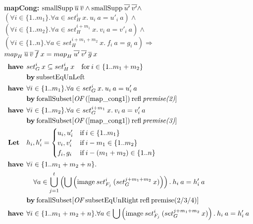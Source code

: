 \needspace{10em}
\textbf{mapCong:} $\text{smallSupp} \: \overline{u} \: \overline{v} \wedge \text{smallSupp} \: \overline{u'} \: \overline{v'} \wedge$ \\
\hspace*{1.7em} $(\forall i \in \{1..m_1\}. \forall a \in set_H^i \: x. \: u_i \: a = u'_i \: a) \wedge$ \\
\hspace*{1.7em} $(\forall i \in \{1..m_2\}. \forall a \in set_H^{i+m_1} \: x. \: v_i \: a = v'_i \: a) \wedge$ \\
\hspace*{1.7em} $(\forall i \in \{1..n\}. \forall a \in set_H^{i+m_1+m_2} \: x. \: f_i \: a = g_i \: a) \Longrightarrow$ \\
\hspace*{3em} ${map}_{H} \: \overline{u} \: \overline{v} \: \overline{f} \: x = {map}_{H} \: \overline{u'} \: \overline{v'} \: \overline{g} \: x$
\begin{align}
\have & set_G^i \: x \subseteq set_H^i \: x \quad \text{for} \: i \in \{1..m_1+m_2\} \label{map_cong1} \\
 & \by \text{subsetEqUnLeft} \nonumber \\
%
\have & \forall i \in \{1..m_1\}. \forall a \in set_G^i \: x. \: u_i \: a = u'_i \: a \label{map_cong2} \\
 & \by \OF{\text{forallSubset}}{(\ref{map_cong1}) \: \text{refl} \: \textit{premise(2)}} \nonumber \\
%
\have & \forall i \in \{1..m_2\}. \forall a \in set_G^{i+m_1} \: x. \: v_i \: a = v'_i \: a \label{map_cong3} \\
 & \by \OF{\text{forallSubset}}{(\ref{map_cong1}) \: \text{refl} \: \textit{premise(3)}} \nonumber \\
%
\textbf{Let} \quad & h_i, h'_i = \begin{cases}
u_i, u'_i & \text{if} \: i \in \{1..m_1\} \\
v_i, v'_i & \text{if} \: i - m_1 \in \{1..m_2\} \\
f_i, g_i & \text{if} \: i - (m_1+m_2) \in \{1..n\}
\end{cases} \nonumber \\
%
\have & \forall i \in \{1..m_1+m_2+n\}. \nonumber \\*
& \quad \forall a \in \bigcup_{j=1}^t \left( \bigcup \left( \text{image} \: set_{F_j}^i \: (set_G^{j+m_1+m_2} \: x) \right) \right). \: h_i \: a = h'_i \: a \label{map_cong5} \\
 & \by \OF{\text{forallSubset}}{\text{subsetEqUnRight} \: \text{refl} \: \text{premise(2/3/4)}} \nonumber \\
%
\have & \forall i \in \{1..m_1+m_2+n\}. \forall a \in \bigcup \left( \text{image} \: set_{F_j}^i \: (set_G^{j+m_1+m_2} \: x) \right). \: h_i \: a = h'_i \: a \label{map_cong6} \\*

\end{align}
